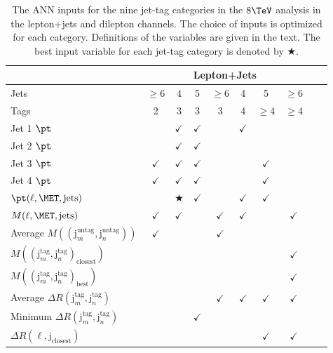 \begin{table}[htp]
        
  \centering
  \noindent
  \small
    \caption{The ANN inputs for the nine jet-tag categories in the $8 \TeV$ \ttH analysis in the lepton+jets and dilepton channels. The choice of inputs
is optimized for each category. Definitions of the variables are given
in the text. The best input variable for each jet-tag category is denoted by 
$\bigstar$.}
    \label{tab:inputs}
    \begin{tabular}{|l|c|c|c|c|c|c|c||c|c|} \hline
& \multicolumn{7}{c|}{Lepton+Jets} \\ \hline
Jets& $\geq$6 & 4 & 5 & $\geq$6 & 4 & 5 & $\geq$6 \\
Tags & 2 & 3 & 3 & 3 & 4 & $\geq$4 & $\geq$4 \\ \hline \hline
Jet 1 $\pt$ & & $\checkmark$ & $\checkmark$ & & $\checkmark$ & & \\
Jet 2 $\pt$ & & $\checkmark$ & $\checkmark$ & & & &  \\
Jet 3 $\pt$ & $\checkmark$ & $\checkmark$ & $\checkmark$ & & & $\checkmark$ &   \\
Jet 4 $\pt$ & $\checkmark$ & $\checkmark$ & $\checkmark$ & & & $\checkmark$ &  \\
$\pt(\ell,\MET,\text{jets})$ & & $\bigstar$ & $\checkmark$ & & $\checkmark$ & $\checkmark$ & \\
$M(\ell,\MET,\text{jets})$ & $\checkmark$ & $\checkmark$ & & $\checkmark$ & $\checkmark$ & & $\checkmark$  \\
Average $M((\text{j}_m^{\text{untag}},\text{j}_n^{\text{untag}}))$ & $\checkmark$ & & & $\checkmark$ & & &  \\
$M((\text{j}_m^{\text{tag}},\text{j}_n^{\text{tag}})_{\text{closest}})$ & & & & & & & $\checkmark$  \\
$M((\text{j}_m^{\text{tag}},\text{j}_n^{\text{tag}})_{\text{best}})$ & & & & & & & $\checkmark$  \\
Average $\Delta R(\text{j}_m^{\text{tag}},\text{j}_n^{\text{tag}})$ & & & & $\checkmark$ & $\checkmark$ & $\checkmark$ & $\checkmark$  \\
Minimum $\Delta R(\text{j}_m^{\text{tag}},\text{j}_n^{\text{tag}})$ & & & $\checkmark$ & & & & \\
$\Delta R(\ell,\text{j}_{\text{closest}})$ & & & & & & $\checkmark$ & $\checkmark$ \\

\end{tabular}
\end{table}
